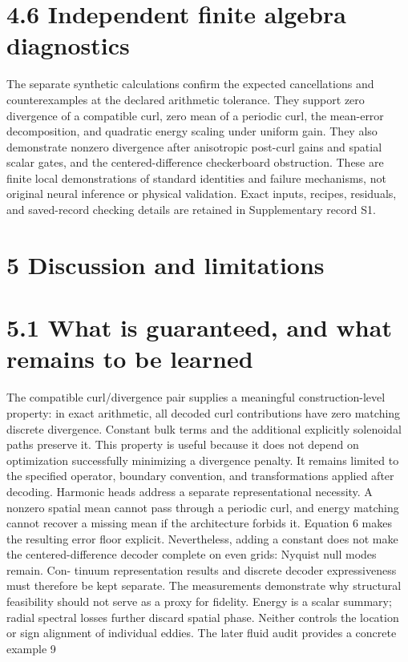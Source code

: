 \documentclass[11pt]{article}
\begin{document}
\section*{4.6 Independent finite algebra diagnostics}

The separate synthetic calculations confirm the expected cancellations and counterexamples at
the declared arithmetic tolerance. They support zero divergence of a compatible curl, zero mean
of a periodic curl, the mean-error decomposition, and quadratic energy scaling under uniform
gain. They also demonstrate nonzero divergence after anisotropic post-curl gains and spatial scalar
gates, and the centered-difference checkerboard obstruction. These are finite local demonstrations
of standard identities and failure mechanisms, not original neural inference or physical validation.
Exact inputs, recipes, residuals, and saved-record checking details are retained in Supplementary
record S1.

\section*{5 Discussion and limitations}


\section*{5.1 What is guaranteed, and what remains to be learned}

The compatible curl/divergence pair supplies a meaningful construction-level property: in exact
arithmetic, all decoded curl contributions have zero matching discrete divergence. Constant bulk
terms and the additional explicitly solenoidal paths preserve it. This property is useful because it
does not depend on optimization successfully minimizing a divergence penalty. It remains limited
to the specified operator, boundary convention, and transformations applied after decoding.
Harmonic heads address a separate representational necessity. A nonzero spatial mean cannot
pass through a periodic curl, and energy matching cannot recover a missing mean if the architecture
forbids it. Equation 6 makes the resulting error floor explicit. Nevertheless, adding a constant does
not make the centered-difference decoder complete on even grids: Nyquist null modes remain. Con-
tinuum representation results and discrete decoder expressiveness must therefore be kept separate.
The measurements demonstrate why structural feasibility should not serve as a proxy for fidelity.
Energy is a scalar summary; radial spectral losses further discard spatial phase. Neither controls the
location or sign alignment of individual eddies. The later fluid audit provides a concrete example
9
\end{document}

